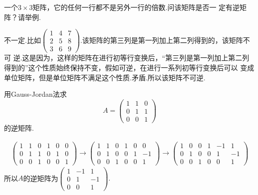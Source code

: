 ﻿\documentclass{book} \usepackage{exsheets} \usepackage{xeCJK}
\begin{document}
\begin{question}
  一个$3\times 3$矩阵，它的任何一行都不是另外一行的倍数.问该矩阵是否一
  定有逆矩阵？请举例.
\end{question}
\begin{solution}
  不一定.比如$
  \begin{pmatrix}
    1&4&7\\
    2&5&8\\
    3&6&9
  \end{pmatrix}.  $该矩阵的第三列是第一列加上第二列得到的，该矩阵不可
  逆.这是因为，这样的矩阵在进行初等行变换后，“第三列是第一列加上第二列
  得到的”这个性质始终保持不变，假如可逆，在进行一系列初等行变换后可以
  变成单位矩阵，但是单位矩阵不满足这个性质.矛盾.所以该矩阵不可逆.
\end{solution}
\begin{question}
  用Gauss-Jordan法求
$$
A=
\begin{pmatrix}
  1&1&0\\
  0&1&1\\
  0&0&1
\end{pmatrix}
$$
的逆矩阵.
\end{question}
\begin{solution}
  \begin{align*}
    \begin{pmatrix}
      1&1&0&1&0&0\\
      0&1&1&0&1&0\\
      0&0&1&0&0&1
    \end{pmatrix}\to
                 \begin{pmatrix}
                   1&1&0&1&0&0\\
                   0&1&0&0&1&-1\\
                   0&0&1&0&0&1
                 \end{pmatrix}\to
                              \begin{pmatrix}
                                1&0&0&1&-1&1\\
                                0&1&0&0&1&-1\\
                                0&0&1&0&0&1
                              \end{pmatrix}
  \end{align*}
所以$A$的逆矩阵为$
\begin{pmatrix}
  1&-1&1\\
0&1&-1\\
0&0&1
\end{pmatrix}.
$
\end{solution}
\end{document}
